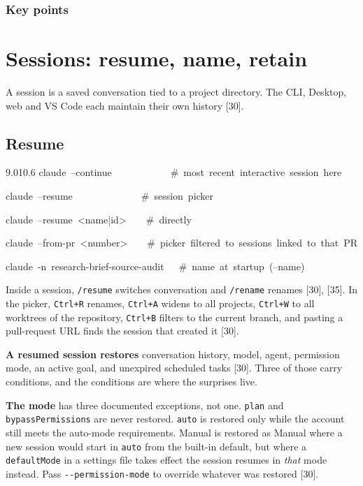 \documentclass[11pt,a4paper,twoside,openany]{book}
\newcommand{\chaptertitlelabel}{}
\newcommand{\cl}[1]{\noindent\mbox{#1}\par}
\begin{document}
  \subsection*{Key points}
  \begin{itemize}\kprows\end{itemize}
\else
  \noindent\kpbody
\fi
\par\addvspace{1.4mm}
\endgroup

\FloatBarrier
\renewcommand{\chaptertitlelabel}{Part III \textperiodcentered\ Chapter 12}
\setcounter{chapter}{11}
\chapter{Sessions: resume, name, retain}

A session is a saved conversation tied to a project directory. The CLI, Desktop, web and VS Code each maintain their own history [30].


\FloatBarrier
\setcounter{section}{0}
\section{Resume}

\begin{codeblock}{9.0}{10.6}
\cl{claude~--continue~~~~~~~~~~~~\#~most~recent~interactive~session~here}
\cl{claude~--resume~~~~~~~~~~~~~~\#~session~picker}
\cl{claude~--resume~<name|id>~~~~\#~directly}
\cl{claude~--from-pr~<number>~~~~\#~picker~filtered~to~sessions~linked~to~that~PR}
\cl{claude~-n~research-brief-source-audit~~~\#~name~at~startup~(--name)}
\end{codeblock}

Inside a session, \texttt{/\allowbreak{}resume} switches conversation and \texttt{/\allowbreak{}rename} renames [30], [35]. In the picker, \texttt{Ctrl+R} renames, \texttt{Ctrl+A} widens to all projects, \texttt{Ctrl+W} to all worktrees of the repository, \texttt{Ctrl+B} filters to the current branch, and pasting a pull-request URL finds the session that created it [30].


\textbf{A resumed session restores} conversation history, model, agent, permission mode, an active goal, and unexpired scheduled tasks [30]. Three of those carry conditions, and the conditions are where the surprises live.


\textbf{The mode} has three documented exceptions, not one. \texttt{plan} and \texttt{bypass\allowbreak{}Permissions} are never restored. \texttt{auto} is restored only while the account still meets the auto-mode requirements. Manual is restored as Manual where a new session would start in \texttt{auto} from the built-in default, but where a \texttt{default\allowbreak{}Mode} in a settings file takes effect the session resumes in \emph{that} mode instead. Pass \texttt{-\allowbreak{}-\allowbreak{}permission-\allowbreak{}mode} to override whatever was restored [30].
\end{document}
